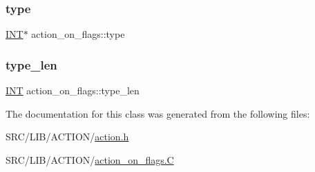 \subsubsection{\texorpdfstring{type}{type}}
{\footnotesize\ttfamily \mbox{\hyperlink{galois_8h_a09fddde158a3a20bd2dcadb609de11dc}{I\+NT}}$\ast$ action\+\_\+on\+\_\+flags\+::type}

\mbox{\label{classaction__on__flags_aa83def90a92203f4a639ff4af313540b}} 
\subsubsection{\texorpdfstring{type\+\_\+len}{type\_len}}
{\footnotesize\ttfamily \mbox{\hyperlink{galois_8h_a09fddde158a3a20bd2dcadb609de11dc}{I\+NT}} action\+\_\+on\+\_\+flags\+::type\+\_\+len}



The documentation for this class was generated from the following files\+:\begin{DoxyCompactItemize}
\item 
S\+R\+C/\+L\+I\+B/\+A\+C\+T\+I\+O\+N/\mbox{\hyperlink{action_8h}{action.\+h}}\item 
S\+R\+C/\+L\+I\+B/\+A\+C\+T\+I\+O\+N/\mbox{\hyperlink{action__on__flags_8_c}{action\+\_\+on\+\_\+flags.\+C}}\end{DoxyCompactItemize}
